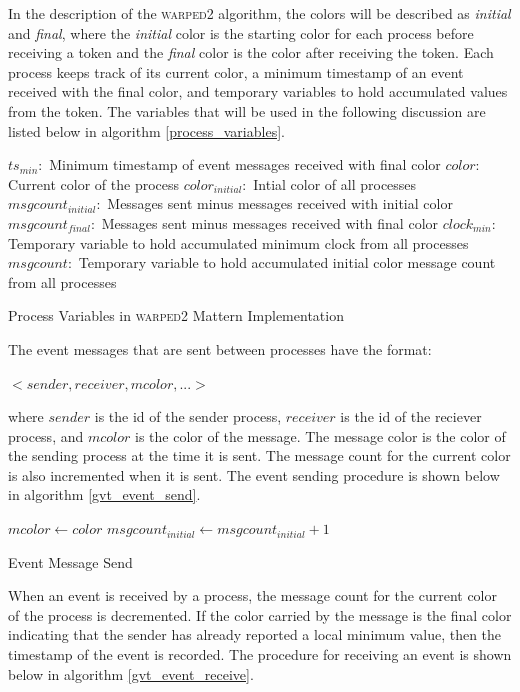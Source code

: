\documentclass[11pt]{book}
\begin{document}
In the description of the \textsc{warped2} algorithm, the colors will be described as
\emph{initial} and \emph{final}, where the \emph{initial} color is the starting color for each
process before receiving a token and the \emph{final} color is the color after receiving the
token. Each process keeps track of its current color, a minimum timestamp of an event received
with the final color, and temporary variables to hold accumulated values from the token. The
variables that will be used in the following discussion are listed below in algorithm
\ref{process_variables}.

\begin{algorithm}
\DontPrintSemicolon
    \boldmath$ts_{min}:$ Minimum timestamp of event messages received with final color\;
    \boldmath$color:$ Current color of the process\;
    \boldmath$color_{initial}:$ Intial color of all processes\;
    \boldmath$msgcount_{initial}:$ Messages sent minus messages received with initial color\;
    \boldmath$msgcount_{final}:$ Messages sent minus messages received with final color\;
    \boldmath$clock_{min}:$ Temporary variable to hold accumulated minimum clock from all processes\;
    \boldmath$msgcount:$ Temporary variable to hold accumulated initial color message count
        from all processes\;
\caption{Process Variables in \textsc{warped2} Mattern Implementation}\label{process_variables}
\end{algorithm}

\noindent
The event messages that are sent between processes have the format:

    $<sender, receiver, mcolor,...>$

\noindent
where $sender$ is the id of the sender process, $receiver$ is the id of the reciever process,
and $mcolor$ is the color of the message. The message color is the color of the sending
process at the time it is sent. The message count for the current color is also incremented
when it is sent. The event sending procedure is shown below in algorithm \ref{gvt_event_send}.

\begin{algorithm}
\DontPrintSemicolon
\SetAlgoVlined
    $mcolor \gets color$\;
     {
      $msgcount_{initial} \gets msgcount_{initial} + 1$\;
    }
\caption{Event Message Send}\label{gvt_event_send}
\end{algorithm}

When an event is received by a process, the message count for the current color of the process
is decremented. If the color carried by the message is the final color indicating that the
sender has already reported a local minimum value, then the timestamp of the event is recorded.
The procedure for receiving an event is shown below in algorithm \ref{gvt_event_receive}.
\end{document}
